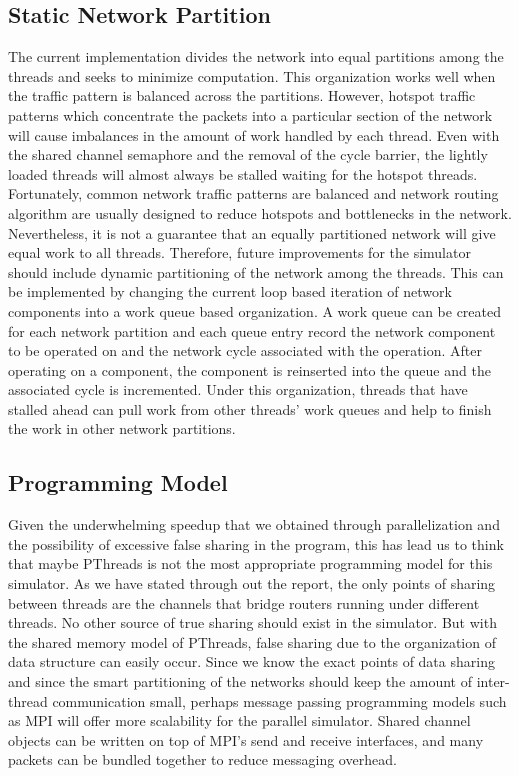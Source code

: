 

\subsection{Static Network Partition}
The current implementation divides the network into equal partitions among the threads and seeks to minimize computation. This organization works well when the traffic pattern is balanced across the partitions. However, hotspot traffic patterns which concentrate the packets into a particular section of the network will cause imbalances in the amount of work handled by each thread. Even with the shared channel semaphore and the removal of the cycle barrier, the lightly loaded threads will almost always be stalled waiting for the hotspot threads. Fortunately, common network traffic patterns are balanced and network routing algorithm are usually designed to reduce hotspots and bottlenecks in the network. Nevertheless, it is not a guarantee that an equally partitioned network will give equal work to all threads. Therefore, future improvements for the simulator should include dynamic partitioning of the network among the threads. This can be implemented by changing the current loop based iteration of network components into a work queue based organization. A work queue can be created for each network partition and each queue entry record the network component to be operated on and the network cycle associated with the operation. After operating on a component, the component is reinserted into the queue and the associated cycle is incremented. Under this organization, threads that have stalled ahead can pull work from other threads' work queues and help to finish the work in other network partitions.  

\subsection{Programming Model}
Given the underwhelming speedup that we obtained through parallelization and the possibility of excessive false sharing in the program, this has lead us to think that maybe PThreads is not the most appropriate programming model for this simulator. As we have stated through out the report, the only points of sharing between threads are the channels that bridge routers running under different threads. No other source of true sharing should exist in the simulator. But with the shared memory model of PThreads, false sharing due to the organization of data structure can easily occur. Since we know the exact points of data sharing and since the smart partitioning of the networks should keep the amount of inter-thread communication small, perhaps message passing programming models such as MPI will offer more scalability for the parallel simulator. Shared channel objects can be written on top of MPI's send and receive interfaces, and many packets can be bundled together to reduce messaging overhead. 
